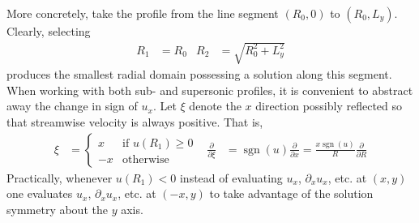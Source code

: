 \documentclass[letterpaper,11pt,nointlimits,reqno]{amsart}
\begin{document}
More concretely, take the profile from the line segment $\left(R_0,0\right)$ to
$\left(R_0,L_y\right)$.  Clearly, selecting
\begin{align}
  R_1 &= R_0
&
  R_2 &= \sqrt{R_0^2 + L_y^2}
\end{align}
produces the smallest radial domain possessing a solution along this segment.
When working with both sub- and supersonic profiles, it is convenient to
abstract away the change in sign of $u_x$.  Let $\xi$ denote the $x$ direction
possibly reflected so that streamwise velocity is always positive.  That is,
\begin{align}
  \xi &= \begin{cases}  x &\mbox{if } u\!\left(R_1\right) \geq 0 \\
                       -x &\mbox{otherwise}
  \end{cases}
&
    \frac{\partial}{\partial\xi}
 &= \operatorname{sgn}(u) \frac{\partial}{\partial{}x}
  = \frac{x \operatorname{sgn}(u)}{R} \frac{\partial}{\partial{}R}
\label{eq:xicoorddef}
\end{align}
Practically, whenever $u\left(R_1\right) < 0$ instead of evaluating $u_x$,
$\partial_x u_x$, etc. at $\left(x,y\right)$ one evaluates $u_x$, $\partial_x
u_x$, etc. at $\left(-x,y\right)$ to take advantage of the solution symmetry
about the $y$ axis.
\end{document}
